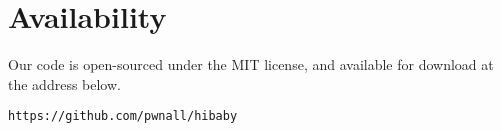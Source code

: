 \section{Availability}

Our code is open-sourced under the MIT license, and available for
download at the address below.

\texttt{https://github.com/pwnall/hibaby}
